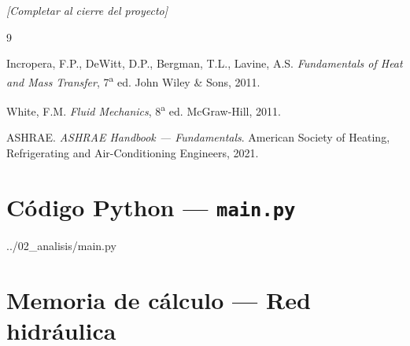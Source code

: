 \documentclass[12pt, letterpaper]{article}
\begin{document}
\textit{[Completar al cierre del proyecto]}

\begin{thebibliography}{9}

  Incropera, F.P., DeWitt, D.P., Bergman, T.L., Lavine, A.S.
  \textit{Fundamentals of Heat and Mass Transfer}, 7\textsuperscript{a} ed.
  John Wiley \& Sons, 2011.

  White, F.M.
  \textit{Fluid Mechanics}, 8\textsuperscript{a} ed.
  McGraw-Hill, 2011.

  ASHRAE.
  \textit{ASHRAE Handbook --- Fundamentals}.
  American Society of Heating, Refrigerating and
  Air-Conditioning Engineers, 2021.

\end{thebibliography}

\appendix

\section{Código Python --- \texttt{main.py}}

  {../02_analisis/main.py}

\section{Memoria de cálculo --- Red hidráulica}
\end{document}
